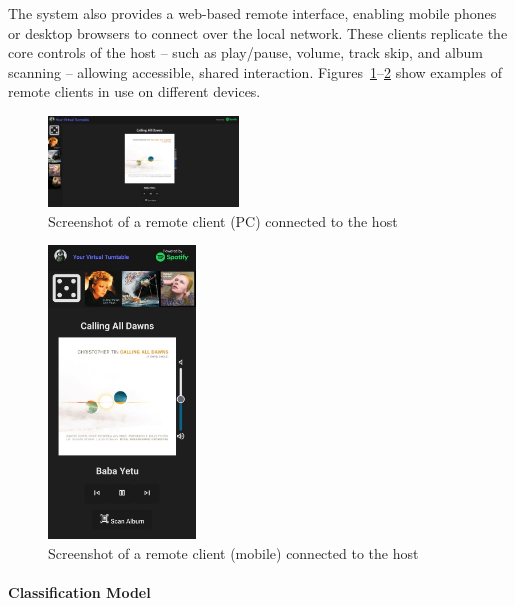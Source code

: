             The system also provides a web-based remote interface, enabling mobile phones or desktop browsers to connect over the local network. These clients replicate the core controls of the host -- such as play/pause, volume, track skip, and album scanning -- allowing accessible, shared interaction. Figures~\ref{fig:laptop}–\ref{fig:phone} show examples of remote clients in use on different devices.
    
            \begin{figure}[h]
                \centering
                \includegraphics[width=0.45\textwidth]{images/screenshots/LAPTOP.png}
                \caption{Screenshot of a remote client (PC) connected to the host}
                \label{fig:laptop}
            \end{figure}
            
            \begin{figure}[h]
                \centering
                \includegraphics[width=0.35\textwidth]{images/screenshots/PHONE.jpg}
                \caption{Screenshot of a remote client (mobile) connected to the host}
                \label{fig:phone}
            \end{figure}
    
            \paragraph{Classification Model}
    
